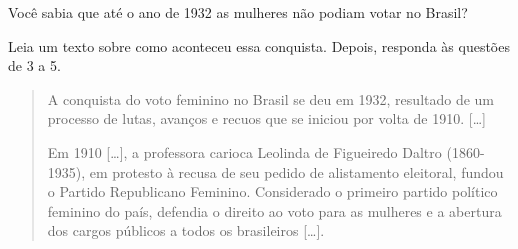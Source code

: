 \begin{mdframed}[linewidth=2pt,linecolor=salmao,roundcorner=20pt]
\vspace{7.5cm}
\end{mdframed}

\noindent{}Você sabia que até o ano de 1932 as mulheres não podiam votar no Brasil?\bigskip

\noindent{}Leia um texto sobre como aconteceu essa conquista. Depois, responda às questões de 3 a 5.\bigskip

\begin{quote}
A conquista do voto feminino no Brasil se deu em 1932, resultado de um
processo de lutas, avanços e recuos que se iniciou por volta de 1910. {[}\ldots{}{]}

Em 1910 {[}\ldots{}{]}, a professora carioca Leolinda de Figueiredo Daltro
(1860-1935), em protesto à recusa de seu pedido de alistamento
eleitoral, fundou o Partido Republicano Feminino. Considerado o primeiro
partido político feminino do país, defendia o direito ao voto para as
mulheres e a abertura dos cargos públicos a todos os brasileiros {[}\ldots{}{]}.
\end{quote}

